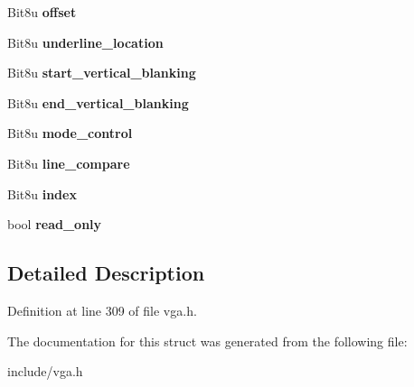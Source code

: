 \begin{DoxyCompactItemize}
\item 
\hypertarget{structVGA__Crtc_a4924ee33276c5db26c158fdf870a6dd8}{Bit8u {\bfseries offset}}\label{structVGA__Crtc_a4924ee33276c5db26c158fdf870a6dd8}

\item 
\hypertarget{structVGA__Crtc_a2219c487b03bb85f3ee0588f98d1d6a6}{Bit8u {\bfseries underline\-\_\-location}}\label{structVGA__Crtc_a2219c487b03bb85f3ee0588f98d1d6a6}

\item 
\hypertarget{structVGA__Crtc_a05e8dd8080f625dceb9b0f4b3306a346}{Bit8u {\bfseries start\-\_\-vertical\-\_\-blanking}}\label{structVGA__Crtc_a05e8dd8080f625dceb9b0f4b3306a346}

\item 
\hypertarget{structVGA__Crtc_a85198ae7825925a3350637af0e91ddc9}{Bit8u {\bfseries end\-\_\-vertical\-\_\-blanking}}\label{structVGA__Crtc_a85198ae7825925a3350637af0e91ddc9}

\item 
\hypertarget{structVGA__Crtc_a4786b1dec0548282000ee6842cdc818f}{Bit8u {\bfseries mode\-\_\-control}}\label{structVGA__Crtc_a4786b1dec0548282000ee6842cdc818f}

\item 
\hypertarget{structVGA__Crtc_a5a1744696d3efa6453e94c7283df9cb6}{Bit8u {\bfseries line\-\_\-compare}}\label{structVGA__Crtc_a5a1744696d3efa6453e94c7283df9cb6}

\item 
\hypertarget{structVGA__Crtc_a25c4b8626ae66354a428340e0cfbc231}{Bit8u {\bfseries index}}\label{structVGA__Crtc_a25c4b8626ae66354a428340e0cfbc231}

\item 
\hypertarget{structVGA__Crtc_a4775a262d32dd75cede031b15845a1eb}{bool {\bfseries read\-\_\-only}}\label{structVGA__Crtc_a4775a262d32dd75cede031b15845a1eb}

\end{DoxyCompactItemize}


\subsection{Detailed Description}


Definition at line 309 of file vga.\-h.



The documentation for this struct was generated from the following file\-:\begin{DoxyCompactItemize}
\item 
include/vga.\-h\end{DoxyCompactItemize}
